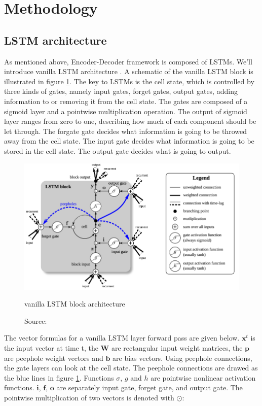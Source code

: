 \documentclass[twoside,a4paper,article]{combine}
\begin{document}
\section{Methodology}
\subsection{LSTM architecture}
As mentioned above, Encoder-Decoder framework is composed of LSTMs. We'll introduce vanilla LSTM architecture \cite{odyssey}. A schematic
of the vanilla LSTM block is illustrated in figure \ref{fig:vanilla}. The key to LSTMs is the cell state, which is controlled by three
kinds of gates, namely input gates, forget gates, output gates, adding information to or removing it from the cell state. 
The gates are composed of a sigmoid layer and a pointwise
multiplication operation. The output of sigmoid layer ranges from zero to one, describing how much of each component should be let through.
The forgate gate decides what information is going to be throwed away from the cell state. The input gate decides what information is going
to be stored in the cell state. The output gate decides what is going to output.
\begin{figure}
    \includegraphics[width=\linewidth]{vanilla}
    \caption{vanilla LSTM block architecture}
    \caption*{Source: \protect\cite{odyssey}}
    \label{fig:vanilla}
\end{figure}

The vector formulas for a vanilla LSTM layer forward pass are given below. $\bm{x}^t$ is the input vector at time t, the $\bm{W}$ are 
rectangular input weight matrices, the $\bm{p}$ are peephole weight vectors and $\bm{b}$ are bias vectors. Using peephole connections, 
the gate layers can look at the cell state. The peephole connections are drawed as the blue lines in figure \ref{fig:vanilla}.
Functions $\sigma$, $g$ and  $h$ are pointwise nonlinear activation functions. $\mathbf{i}$, $\mathbf{f}$, $\mathbf{o}$ are separately
input gate, forget gate, and output gate. The pointwise multiplication of two vectors is denoted with $\odot$:
\end{document}
